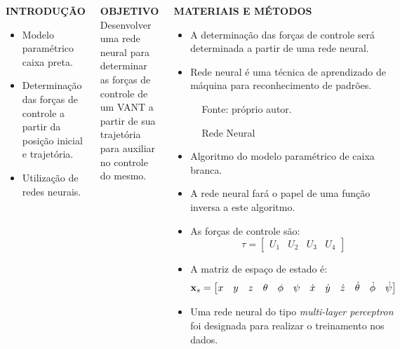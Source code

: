 \documentclass[serif,20pt]{beamer}
\begin{document}
\begin{frame}[t]
\begin{columns}[t]
\begin{block}{\centering\bfseries INTRODUÇÃO}
\begin{itemize}
    \item Modelo paramétrico caixa preta.
    \item Determinação das forças de controle a partir da posição inicial e trajetória.
    \item Utilização de redes neurais.
\end{itemize}
\end{block}
%
\begin{block}{\centering\bfseries OBJETIVO}
Desenvolver uma rede neural para determinar as forças de controle de um VANT a partir de sua trajetória para auxiliar no controle do mesmo.
\end{block}
%
\begin{block}{\centering\bfseries MATERIAIS E MÉTODOS}

\begin{itemize}
    \item A determinação das forças de controle será determinada a partir de uma rede neural.
    \item Rede neural é uma técnica de aprendizado de máquina para reconhecimento de padrões.\cite{haykin1999}
\end{itemize}
%
\begin{figure}[H]
    \centering
    \caption{Rede Neural}
    

    {\footnotesize Fonte: próprio autor.}
    \label{fig:rede_neural}
\end{figure}

\begin{itemize}
    \item Algoritmo do modelo paramétrico de caixa branca.\cite{geronel2023}
    \item A rede neural fará o papel de uma função inversa a este algoritmo.
    \item As forças de controle são:
    \begin{equation}
        \tau = \begin{bmatrix}
            U_1 & U_2 & U_3 & U_4
        \end{bmatrix}
    \end{equation}
    \item A matriz de espaço de estado é:
    \begin{equation}
        \setcounter{MaxMatrixCols}{20}
        \mathbf{x}_s = \begin{bmatrix}
            x & y & z & \theta & \phi & \psi & \dot{x} & \dot{y} & \dot{z} & \dot{\theta} & \dot{\phi} & \dot{\psi}
        \end{bmatrix}
    \end{equation}
    \item Uma rede neural do tipo \emph{multi-layer perceptron} foi designada para realizar o treinamento nos dados.
\end{itemize}


\end{block}
\end{columns}
\end{frame}
\end{document}
